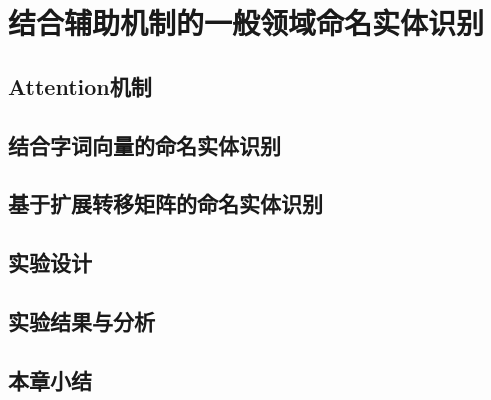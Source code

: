 \chapter{结合辅助机制的一般领域命名实体识别}
\section{Attention机制}
\section{结合字词向量的命名实体识别}
\section{基于扩展转移矩阵的命名实体识别}
\section{实验设计}
\section{实验结果与分析}
\section{本章小结}
